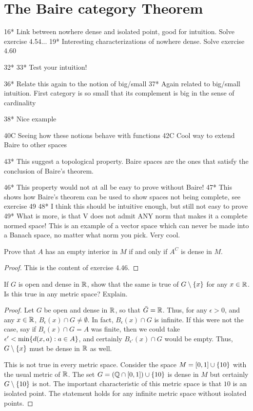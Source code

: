 \section{The Baire category Theorem}

16* Link between nowhere dense and isolated point, good for intuition. Solve exercise 4.54...
19* Interesting characterizations of nowhere dense. Solve exercise 4.60

32* 
33* Test your intuition! 

36* Relate this again to the notion of big/small 
37* Again related to big/small intuition. First category is so small that its complement is big in the sense of cardinality 

38* Nice example 

40C Seeing how these notions behave with functions 
42C Cool way to extend Baire to other spaces 

43* This suggest a topological property. Baire spaces are the ones that satisfy the conclusion of Baire's theorem.

46* This property would not at all be easy to prove without Baire!
47* This shows how Baire's theorem can be used to show spaces not being complete, see exercise 49
48* I think this should be intuitive enough, but still not easy to prove 
49* What is more, is that V does not admit ANY norm that makes it a complete normed space! This is an example of a vector space which can never be made into a Banach space, no matter what norm you pick. Very cool. 


\begin{exercise}{14}
Prove that $A$ has an empty interior in $M$ if and only if $A^C$ is dense in $M$.
\end{exercise}
\begin{proof}
This is the content of exercise 4.46.
\end{proof} 

\begin{exercise}{15}
If $G$ is open and dense in $\mathbb{R}$, show that the same is true of $G\setminus\{x\}$ for any $x\in\mathbb{R}$. 
Is this true in any metric space?
Explain.
\end{exercise}
\begin{proof}
Let $G$ be open and dense in $\mathbb{R}$, so that $\bar{G}=\mathbb{R}$.
Thus, for any $\epsilon>0$, and any $x\in\mathbb{R}$, $B_\epsilon(x)\cap G\neq \emptyset$.
In fact, $B_\epsilon(x)\cap G$ is infinite.
If this were not the case, say if $B_\epsilon(x)\cap G = A$ was finite, then we could take $\epsilon' < \min\{d(x,a): a\in A\}$, and certainly $B_{\epsilon'}(x)\cap G$ would be empty. 
Thus, $G\setminus\{x\}$ must be dense in $\mathbb{R}$ as well.

This is not true in every metric space.
Consider the space $M=[0,1]\cup \{10\}$ with the usual metric of $\mathbb{R}$.
The set $G = (\mathbb{Q}\cap[0,1]) \cup \{10\}$ is dense in $M$ but certainly $G\setminus\{10\}$ is not.
The important characteristic of this metric space is that $10$ is an isolated point.
The statement holds for any infinite metric space without isolated points.
\end{proof} 

